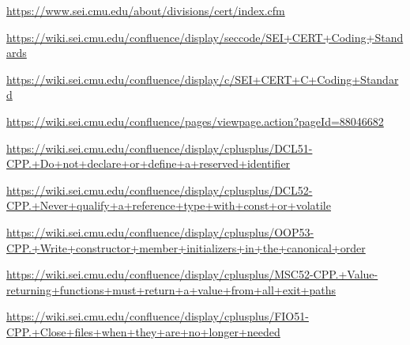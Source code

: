 
\begin{thebibliography}{0}
	
	\url{https://www.sei.cmu.edu/about/divisions/cert/index.cfm}
	
	\url{https://wiki.sei.cmu.edu/confluence/display/seccode/SEI+CERT+Coding+Standards}

	\url{https://wiki.sei.cmu.edu/confluence/display/c/SEI+CERT+C+Coding+Standard}

	\url{https://wiki.sei.cmu.edu/confluence/pages/viewpage.action?pageId=88046682}

	\url{https://wiki.sei.cmu.edu/confluence/display/cplusplus/DCL51-CPP.+Do+not+declare+or+define+a+reserved+identifier}

	\url{https://wiki.sei.cmu.edu/confluence/display/cplusplus/DCL52-CPP.+Never+qualify+a+reference+type+with+const+or+volatile}

	\url{https://wiki.sei.cmu.edu/confluence/display/cplusplus/OOP53-CPP.+Write+constructor+member+initializers+in+the+canonical+order}

	\url{https://wiki.sei.cmu.edu/confluence/display/cplusplus/MSC52-CPP.+Value-returning+functions+must+return+a+value+from+all+exit+paths}

	\url{https://wiki.sei.cmu.edu/confluence/display/cplusplus/FIO51-CPP.+Close+files+when+they+are+no+longer+needed}


	
\end{thebibliography}

